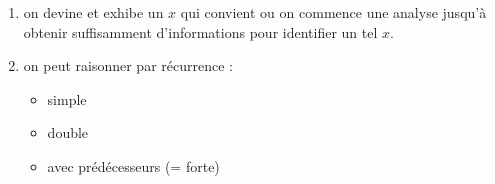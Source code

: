 \begin{enumerate}
    \item{}
    on devine et exhibe un $x$ qui convient ou on commence une analyse jusqu'à obtenir
    suffisamment d'informations pour identifier un tel $x$.

    \item{}
    on peut raisonner par récurrence : 
    \begin{itemize}
        \item simple
        \item double
        \item avec prédécesseurs (= forte)
    \end{itemize}
\end{enumerate}
